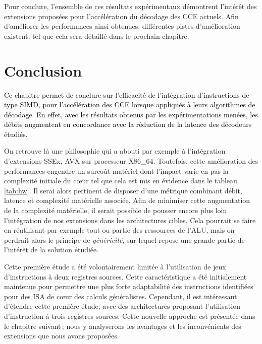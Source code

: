 \documentclass[../main.tex]{subfiles}
\begin{document}
Pour conclure, l'ensemble de ces résultats expérimentaux démontrent l'intérêt des extensions proposées pour l'accélération du décodage des CCE actuels. Afin d'améliorer les performances ainsi obtenues, différentes pistes d'amélioration existent, tel que cela sera détaillé dans le prochain chapitre.



%
%
%
%
\section{Conclusion}
%
%
%
%
\textcolor{black}{Ce chapitre permet de conclure sur l'efficacité de l'intégration d'instructions de type SIMD, pour l'accélération des CCE lorsque appliqués à leurs algorithmes de décodage. 
En effet, avec les résultats obtenus par les expérimentations menées, les débits augmentent en concordance avec la réduction de la latence des décodeurs étudiés.}

On retrouve là une philosophie qui a abouti par exemple à l'intégration d'extensions SSEx, AVX sur processeur X86\_64. 
Toutefois, cette amélioration des performances engendre un surcoût matériel dont l'impact varie en pas la complexité initiale du cœur tel que cela est mis en évidence dans le tableau \ref{tab:hw}. Il serai 
alors pertinent de disposer d'une métrique combinant débit, latence et complexité matérielle associée. 
Afin de minimiser cette augmentation de la complexité matérielle, il serait possible de pousser encore plus loin l'intégration de nos extensions dans les architectures cibles. 
Cela pourrait se faire en réutilisant par exemple tout ou partie des ressources de l'ALU, mais on perdrait alors le principe de \textit{généricité}, sur lequel repose une grande partie de l'intérêt de la solution étudiée.

Cette première étude a été volontairement limitée à l'utilisation de jeux d'instructions à deux registres sources. 
Cette caractéristique a été initialement maintenue pour permettre une plus forte adaptabilité des instructions identifiées pour des ISA de cœur des calculs généralistes. 
Cependant, il est intéressant d'étendre cette première étude, avec des architectures proposant l'utilisation d'instruction à trois registres sources. 
Cette nouvelle approche est présentée dans le chapitre suivant ; nous y analyserons les avantages et les inconvénients des extensions que nous avons proposées.
\end{document}
